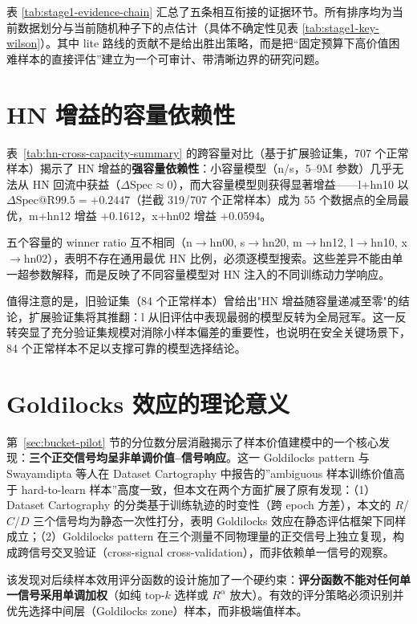 \documentclass[UTF8,openany,12pt]{ctexbook}
\begin{document}
表 \ref{tab:stage1-evidence-chain} 汇总了五条相互衔接的证据环节。所有排序均为当前数据划分与当前随机种子下的点估计（具体不确定性见表 \ref{tab:stage1-key-wilson}）。其中 lite 路线的贡献不是给出胜出策略，而是把“固定预算下高价值困难样本的直接评估”建立为一个可审计、带清晰边界的研究问题。

\section{HN 增益的容量依赖性}
表~\ref{tab:hn-cross-capacity-summary} 的跨容量对比（基于扩展验证集，707 个正常样本）揭示了 HN 增益的\textbf{强容量依赖性}：小容量模型（n/s，5--9M 参数）几乎无法从 HN 回流中获益（$\Delta\mathrm{Spec} \approx 0$），而大容量模型则获得显著增益——l+hn10 以 $\Delta\mathrm{Spec@R99.5} = +0.2447$（拦截 319/707 个正常样本）成为 55 个数据点的全局最优，m+hn12 增益 $+$0.1612，x+hn02 增益 $+$0.0594。

五个容量的 winner ratio 互不相同（n$\to$hn00, s$\to$hn20, m$\to$hn12, l$\to$hn10, x$\to$hn02），表明不存在通用最优 HN 比例，必须逐模型搜索。这些差异不能由单一超参数解释，而是反映了不同容量模型对 HN 注入的不同训练动力学响应。

值得注意的是，旧验证集（84 个正常样本）曾给出"HN 增益随容量递减至零"的结论，扩展验证集将其推翻：l 从旧评估中表现最弱的模型反转为全局冠军。这一反转突显了充分验证集规模对消除小样本偏差的重要性，也说明在安全关键场景下，84 个正常样本不足以支撑可靠的模型选择结论。

\section{Goldilocks 效应的理论意义}
第~\ref{sec:bucket-pilot} 节的分位数分层消融揭示了样本价值建模中的一个核心发现：\textbf{三个正交信号均呈非单调价值--信号响应}。这一 Goldilocks pattern 与 Swayamdipta 等人在 Dataset Cartography \cite{swayamdipta2020cartography} 中报告的”ambiguous 样本训练价值高于 hard-to-learn 样本”高度一致，但本文在两个方面扩展了原有发现：（1）Dataset Cartography 的分类基于训练轨迹的时变性（跨 epoch 方差），本文的 $R$/$C$/$D$ 三个信号均为静态一次性打分，表明 Goldilocks 效应在静态评估框架下同样成立；（2）Goldilocks pattern 在三个测量不同物理量的正交信号上独立复现，构成跨信号交叉验证（cross-signal cross-validation），而非依赖单一信号的观察。

该发现对后续样本效用评分函数的设计施加了一个硬约束：\textbf{评分函数不能对任何单一信号采用单调加权}（如纯 top-$k$ 选样或 $R^{\alpha}$ 放大）。有效的评分策略必须识别并优先选择中间层（Goldilocks zone）样本，而非极端值样本。
\end{document}

